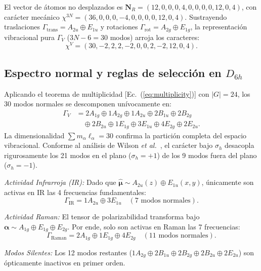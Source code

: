 El vector de átomos no desplazados es $\mathbf{N}_R = (12, 0, 0, 0, 4, 0, 0, 0, 0, 12, 0, 4)$, con carácter mecánico $\chi^{3N} = (36, 0, 0, 0, -4, 0, 0, 0, 0, 12, 0, 4)$. Sustrayendo traslaciones $\Gamma_{\text{trans}} = A_{2u} \oplus E_{1u}$ y rotaciones $\Gamma_{\text{rot}} = A_{2g} \oplus E_{1g}$, la representación vibracional pura $\Gamma_V$ ($3N - 6 = 30$ modos) arroja los caracteres:
\begin{equation}
\chi^V = (30, -2, 2, 2, -2, 0, 0, 2, -2, 12, 0, 4).
\end{equation}

\subsection{Espectro normal y reglas de selección en $D_{6h}$}
Aplicando el teorema de multiplicidad [Ec.~(\ref{eq:multiplicity})] con $|G| = 24$, los 30 modos normales se descomponen unívocamente en:
\begin{align}
\Gamma_V &= 2A_{1g} \oplus 1A_{2g} \oplus 1A_{2u} \oplus 2B_{1u} \oplus 2B_{2g} \nonumber \\
         &\quad \oplus 2B_{2u} \oplus 1E_{1g} \oplus 3E_{1u} \oplus 4E_{2g} \oplus 2E_{2u}.
\label{eq:benceno_descomposicion}
\end{align}
La dimensionalidad $\sum m_\alpha \ell_\alpha = 30$ confirma la partición completa del espacio vibracional. Conforme al análisis de Wilson \emph{et al.}~\cite{Wilson1955}, el carácter bajo $\sigma_h$ desacopla rigurosamente los 21 modos en el plano ($\sigma_h = +1$) de los 9 modos fuera del plano ($\sigma_h = -1$).

\textit{Actividad Infrarroja (IR):} Dado que $\hat{\bm{\mu}} \sim A_{2u}(z) \oplus E_{1u}(x, y)$, únicamente son activas en IR las 4 frecuencias fundamentales:
\begin{equation}
\Gamma_{\text{IR}} = 1A_{2u} \oplus 3E_{1u} \quad (7 \text{ modos normales}).
\end{equation}

\textit{Actividad Raman:} El tensor de polarizabilidad transforma bajo $\bm{\alpha} \sim A_{1g} \oplus E_{1g} \oplus E_{2g}$. Por ende, solo son activas en Raman las 7 frecuencias:
\begin{equation}
\Gamma_{\text{Raman}} = 2A_{1g} \oplus 1E_{1g} \oplus 4E_{2g} \quad (11 \text{ modos normales}).
\end{equation}

\textit{Modos Silentes:} Los 12 modos restantes ($1A_{2g} \oplus 2B_{1u} \oplus 2B_{2g} \oplus 2B_{2u} \oplus 2E_{2u}$) son ópticamente inactivos en primer orden.
